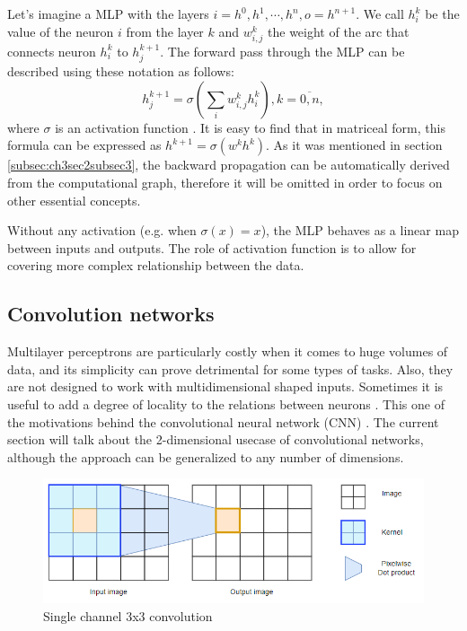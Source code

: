 Let's imagine a MLP with the layers $i=h^0, h^1, \cdots, h^n, o=h^{n+1}$. We call $h^{k}_{i}$ be the value of the neuron $i$ from the layer $k$ and $w^k_{i,j}$ the weight of the arc that connects neuron $h^{k}_{i}$ to $h^{k+1}_j$. The forward pass through the MLP can be described using these notation as follows:
$$h^{k+1}_j = \sigma\left(\sum_{i}{w^k_{i,j} h^k_{i}}\right), k=\overline{0,n},$$
where $\sigma$ is an activation function \cite{D2l}. It is easy to find that in matriceal form, this formula can be expressed as $h^{k+1}=\sigma(w^k h^k)$. As it was mentioned in section \ref{subsec:ch3sec2subsec3}, the backward propagation can be automatically derived from the computational graph, therefore it will be omitted in order to focus on other essential concepts.

Without any activation (e.g. when $\sigma(x)=x$), the MLP behaves as a linear map between inputs and outputs. The role of activation function is to allow for covering more complex relationship between the data. 

\subsection{Convolution networks}
\label{subsec:ch3sec3subsec3}

Multilayer perceptrons are particularly costly when it comes to huge volumes of data, and its simplicity can prove detrimental for some types of tasks. Also, they are not designed to work with multidimensional shaped inputs. Sometimes it is useful to add a degree of locality to the relations between neurons \cite{D2l}. This one of the motivations behind the convolutional neural network (CNN) \cite{cnn}. The current section will talk about the 2-dimensional usecase of convolutional networks, although the approach can be generalized to any number of dimensions.

\begin{figure}[htbp]
    \centering
        \includegraphics[scale=0.6]{figures/conv2d.PNG}
    \caption{Single channel 3x3 convolution}
    \label{FigConv2D}        
\end{figure}


